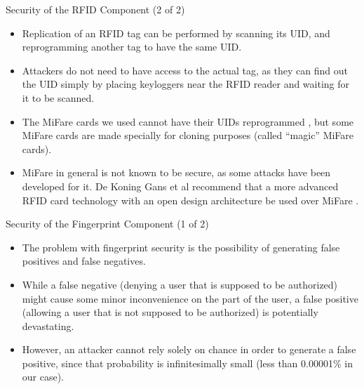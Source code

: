 \begin{frame}{Security of the RFID Component (2 of 2)}
\begin{itemize}
    \item<1-> Replication of an RFID tag can be performed by scanning its UID, and reprogramming another tag to have the same UID.
    \item<2-> Attackers do not need to have access to the actual tag, as they can find out the UID simply by placing keyloggers near the RFID reader and waiting for it to be scanned.
    \item<3-> The MiFare cards we used cannot have their UIDs reprogrammed , but some MiFare cards are made specially for cloning purposes (called ``magic'' MiFare cards).
    \item<4-> MiFare in general is not known to be secure, as some attacks have been developed for it. De Koning Gans et al recommend that a more advanced RFID card technology with an open design architecture be used over MiFare .
\end{itemize}
\end{frame}

\begin{frame}{Security of the Fingerprint Component (1 of 2)}
\begin{itemize}
    \item<1-> The problem with fingerprint security is the possibility of generating false positives and false negatives. 
    \item<2-> While a false negative (denying a user that is supposed to be authorized) might cause some minor inconvenience on the part of the user, a false positive (allowing a user that is not supposed to be authorized) is potentially devastating.
    \item<3-> However, an attacker cannot rely solely on chance in order to generate a false positive, since that probability is infinitesimally small (less than 0.00001\% in our case).
\end{itemize}
\end{frame}


